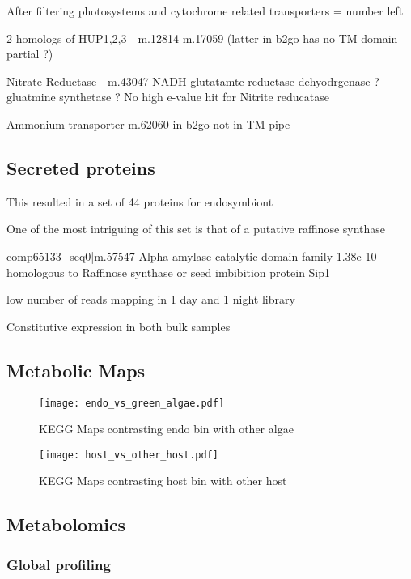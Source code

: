After filtering photosystems and cytochrome related transporters = number left


2 homologs of HUP1,2,3 - m.12814 m.17059 (latter in b2go has no TM domain - partial ?)


Nitrate Reductase - m.43047  
NADH-glutatamte reductase dehyodrgenase ?
gluatmine synthetase ?
No high e-value hit for Nitrite reducatase

Ammonium transporter m.62060 in b2go not in TM pipe






\subsection{Secreted proteins}

This resulted in a set of 44 proteins for endosymbiont 




One of the most intriguing of this set is that
of a putative raffinose synthase


comp65133\_seq0|m.57547 Alpha amylase catalytic domain family
1.38e-10
homologous to Raffinose synthase or seed imbibition protein Sip1


low number of reads mapping in 1 day and 1 night library

Constitutive expression in both bulk samples 

\subsection{Metabolic Maps}

\begin{figure}
    \texttt{[image: endo\_vs\_green\_algae.pdf]}
    \caption[KEGG Maps of Endosymbiont Bin Compared with Other Algae]{
    KEGG Maps contrasting endo bin with other algae}
\end{figure}

\begin{figure}
    \texttt{[image: host\_vs\_other\_host.pdf]}
    \caption[KEGG Maps of Host Bin Compared with Other \textit{Paramecium}]{
    KEGG Maps contrasting host bin with other host}
\end{figure}

\subsection{Metabolomics} 

\subsubsection{Global profiling}

